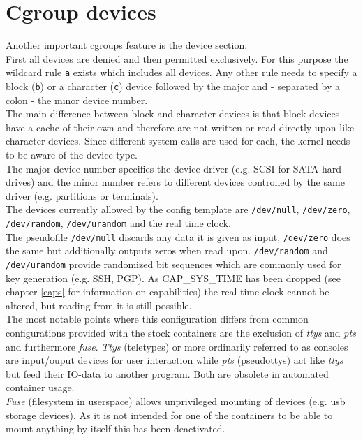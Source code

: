 \section{Cgroup devices}

Another important cgroups feature is the device section.\\
First all devices are denied and then permitted exclusively. For this purpose the wildcard rule \texttt{a} exists which includes
all devices. Any other rule needs to specify a block (\texttt{b}) or a character (\texttt{c}) device followed by the major and
- separated by a colon - the minor device number.\\
The main difference between block and character devices is that block devices have a cache of their own and therefore are not
written or read directly upon like character devices. Since different system calls are used for each, the kernel
needs to be aware of the device type.\\%
The major device number specifies the device driver (e.g. SCSI for SATA hard drives) and the minor number refers to different
devices controlled by the same driver (e.g. partitions or terminals)\cite{devicenumbers}.\\
The devices currently allowed by the config template are \texttt{/dev/null}, \texttt{/dev/zero}, \texttt{/dev/random}, \texttt{/dev/urandom}
and the real time clock.\\
The pseudofile \texttt{/dev/null} discards any data it is given as input, \texttt{/dev/zero} does the same but additionally
outputs zeros when read upon. \texttt{/dev/random} and \texttt{/dev/urandom} provide randomized bit sequences which are
commonly used for key generation (e.g. SSH, PGP). As CAP\_SYS\_TIME has been dropped (see chapter \ref{caps} for information on capabilities)
the real time clock cannot be altered, but reading from it is still possible.\\
The most notable points where this configuration differs from common configurations provided with the stock containers are
the exclusion of \textit{ttys} and \textit{pts} and furthermore \textit{fuse}.
\textit{Ttys} (teletypes) or more ordinarily referred to as consoles are input/ouput devices for user interaction while \textit{pts}
(pseudottys) act like \textit{ttys} but feed their IO-data to another program. Both are obsolete in automated container usage.\\
\textit{Fuse} (filesystem in userspace)\cite{fuse} allows unprivileged mounting of devices (e.g. usb storage devices). As it is not intended for
one of the containers to be able to mount anything by itself this has been deactivated.


